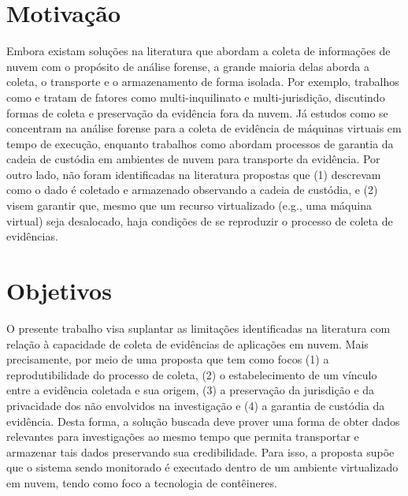\section{Motivação}
\label{sec:intro-motiv}


%
Embora existam soluções na literatura que abordam a coleta de informações de nuvem com o propósito de análise forense, a grande maioria delas aborda a coleta, o transporte e o armazenamento de forma isolada.
%
Por exemplo, trabalhos como \cite{DykstraFROST:2013} e \cite{ReichertAutoAcquisition:2015} tratam de fatores como multi-inquilinato e multi-jurisdição, discutindo formas de coleta e preservação da evidência fora da nuvem.
%
Já estudos como \cite{GeorgeDF2CE:2012} se concentram na análise forense para a coleta de evidência de máquinas virtuais em tempo de execução, enquanto trabalhos como \cite{SangLogApproach:2013} abordam processos de garantia da cadeia de custódia em ambientes de nuvem para transporte da evidência.
%
%
%
Por outro lado, não foram identificadas na literatura propostas que (1) descrevam como o dado é coletado e armazenado observando a cadeia de custódia, e (2) visem garantir que, mesmo que um recurso virtualizado (e.g., uma máquina virtual) seja desalocado, haja condições de se reproduzir o processo de coleta de evidências.

\section{Objetivos}
\label{sec:intro-objetivos}

%
O presente trabalho visa suplantar as limitações identificadas na literatura com relação à capacidade de coleta de evidências de aplicações em nuvem.
%
Mais precisamente, por meio de uma proposta que tem como focos (1) a reprodutibilidade do processo de coleta, (2) o estabelecimento de um vínculo entre a evidência coletada e sua origem, (3) a preservação da jurisdição e da privacidade dos não envolvidos na investigação e (4) a garantia de custódia da evidência.
%
Desta forma, a solução buscada deve prover uma forma de obter dados relevantes para investigações ao mesmo tempo que permita transportar e armazenar tais dados preservando sua credibilidade.
%
Para isso, a proposta supõe que o sistema sendo monitorado é executado dentro de um ambiente virtualizado em nuvem, tendo como foco a tecnologia de contêineres. 



